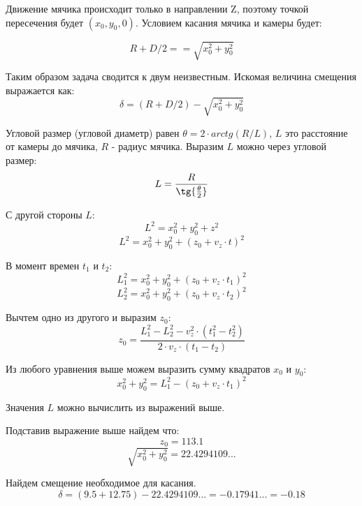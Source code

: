\solutionSection
Движение мячика происходит только в направлении Z, поэтому точкой пересечения будет $(x_0, y_0, 0)$.  Условием касания мячика и камеры будет:

\[R + D/2 == \sqrt{x_0^2 + y_0^2} \]

Таким образом задача сводится к двум неизвестным. Искомая величина смещения выражается как:
\[\delta = (R + D/2) - \sqrt{x_0^2 + y_0^2}\]

Угловой размер (угловой диаметр) равен $\theta = 2 \cdot arctg(R/L)$, $L$ это расстояние  от камеры до мячика, $R$ - радиус мячика. Выразим $L$ можно через угловой размер:
\[ L = \frac{R}{\tg{\frac{\theta}{2}}} \]

С другой стороны $L$:
\[L^2 = x_0^2 + y_0^2 + z^2 \]
\[L^2 = x_0^2 + y_0^2 + (z_0 + v_z \cdot t)^2 \]

В момент времен $t_1$ и $t_2$:
\[L_1^2 = x_0^2 + y_0^2 + (z_0 + v_z \cdot t_1)^2 \]
\[L_2^2 = x_0^2 + y_0^2 + (z_0 + v_z \cdot t_2)^2 \]

Вычтем одно из другого и выразим $z_0$:
\[ z_0 = \frac{L_1^2 - L_2^2 - v_z^2  \cdot  (t_1^2 - t_2^2)}{2 \cdot v_z \cdot (t_1 - t_2)} \]

Из любого уравнения выше можем выразить сумму квадратов $x_0$ и $y_0$:
\[x_0^2 + y_0^2 = L_1^2 - (z_0 + v_z \cdot t_1)^2 \]

Значения $L$ можно вычислить из выражений выше.

Подставив выражение выше найдем что:
\[ z_0 =  113.1\]
\[ \sqrt{x_0^2 + y_0^2} =  22.4294109 ...\]

Найдем смещение необходимое для касания.
\[ \delta = (9.5 + 12.75) - 22.4294109 ... = -0.17941 ... = -0.18\]

